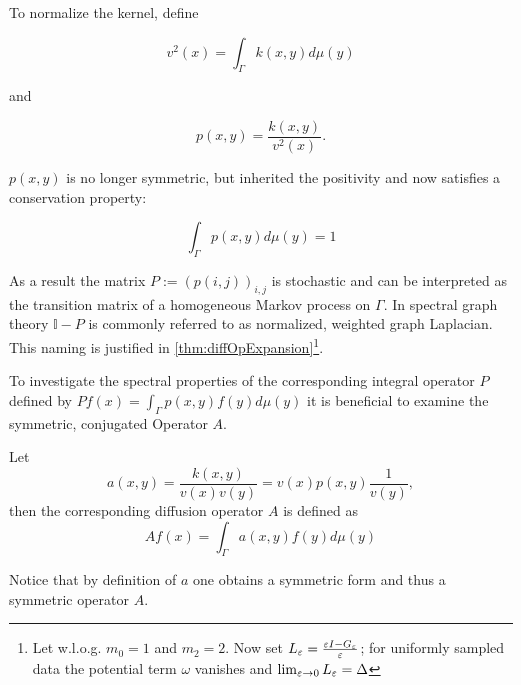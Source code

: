 To normalize the kernel, define
\begin{definition}\label{def:normFunc}
$$v^2(x)=\int_\Gamma k(x,y)d\mu(y)$$
\end{definition}
and
\begin{definition}
$$p(x,y)=\frac{k(x,y)}{v^2(x)}.$$
\end{definition}
$p(x,y)$ is no longer symmetric, but inherited the positivity and now satisfies a conservation property:

\begin{equation*}
\int_\Gamma p(x,y)d\mu(y)=1
\end{equation*}

As a result the matrix $P:=(p(i,j))_{i,j}$ is stochastic and can be interpreted as the transition matrix of a homogeneous Markov process on $\Gamma$. In spectral graph theory $\mathbb{I}-P$ is commonly referred to as normalized, weighted graph Laplacian. This naming is justified in \ref{thm:diffOpExpansion}\footnote{Let w.l.o.g. $m_0=1$ and $m_2=2$. Now set $L_\varepsilon = \frac{\varepsilon I - G_\varepsilon}{\varepsilon}$; for uniformly sampled data the potential term $\omega$ vanishes and $\lim_{\varepsilon\rightarrow 0} L_\varepsilon = \Delta$}.

To investigate the spectral properties of the corresponding integral operator $P$ defined by $Pf(x)=\int_\Gamma p(x,y)f(y)d\mu(y)$ it is beneficial to examine the symmetric, conjugated Operator $A$.

\begin{definition}
Let $$a(x,y)=\frac{k(x,y)}{v(x)v(y)}=v(x)p(x,y)\frac{1}{v(y)},$$ then the corresponding diffusion operator $A$ is defined as $$Af(x)=\int_\Gamma a(x,y)f(y)d\mu(y)$$
\end{definition}

Notice that by definition of $a$ one obtains a symmetric form and thus a symmetric operator $A$.


